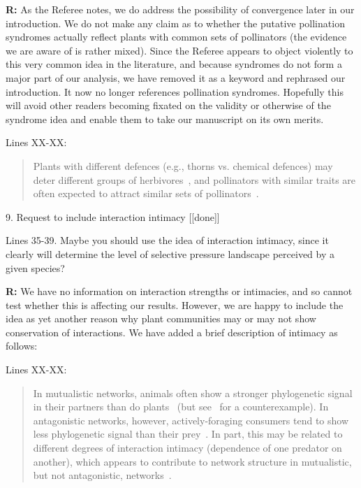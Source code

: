 \documentclass[12pt]{letter}
\newenvironment{refquote}{\bigskip \begin{it}}{\end{it}\smallskip}
\begin{document}
		\textbf{R:} As the Referee notes, we do address the possibility of convergence later in our introduction. We do not make any claim as to whether the putative pollination syndromes actually reflect plants with common sets of pollinators (the evidence we are aware of is rather mixed). Since the Referee appears to object violently to this very common idea in the literature, and because syndromes do not form a major part of our analysis, we have removed it as a keyword and rephrased our introduction. It now no longer references pollination syndromes. Hopefully this will avoid other readers becoming fixated on the validity or otherwise of the syndrome idea and enable them to take our manuscript on its own merits.


		Lines XX-XX:

		\begin{quotation}

			Plants with different defences 
		  	(e.g., thorns vs. chemical defences) may deter different groups of 
		  	herbivores~\citep{Ehrlich1964,Johnson2014}, and pollinators with similar traits are often expected to attract similar sets of pollinators~\citep{Waser1996,Fenster2004,Ollerton2009}.

		\end{quotation}


	9. Request to include interaction intimacy [[done]]

		\begin{refquote}
		Lines 35-39. Maybe you should use the idea of interaction intimacy, since it clearly will determine the level of selective pressure landscape perceived by a given species?
		\end{refquote}


		\textbf{R:} We have no information on interaction strengths or intimacies, and so cannot test whether this is affecting our results. However, we are happy to include the idea as yet another reason why plant communities may or may not show conservation of interactions. We have added a brief description of intimacy as follows:


		Lines XX-XX:

		\begin{quotation}

			In mutualistic networks, animals often show a stronger phylogenetic signal in their partners than do plants~\citep{Rezende2007a,Chamberlain2014,Rohr2014,Vamosi2014,Lind2015,Fontaine2015} (but see~\citet{Rafferty2013} for a counterexample). In antagonistic networks, however, actively-foraging consumers tend to show less phylogenetic signal than their prey~\citep{Ives2006,Cagnolo2011,Naisbit2011,Fontaine2015}. In part, this may be related to different degrees of interaction intimacy (dependence of one predator on another), which appears to contribute to network structure in mutualistic, but not antagonistic, networks~\citep{Guimaraes2007,Ponisio2017}. 

		\end{quotation}
\end{document}
